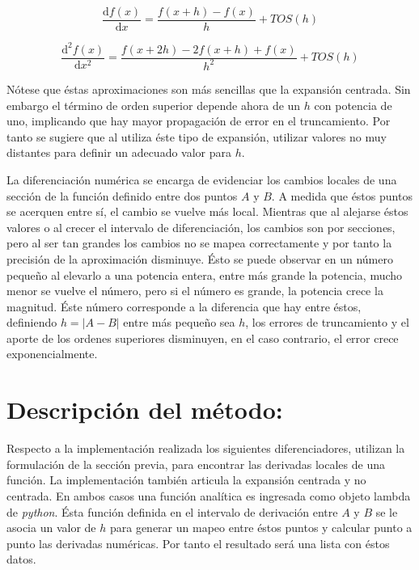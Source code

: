 \documentclass[letterpaper,10pt,oneside]{sphinxmanual}
\theoremstyle{plain}%
\theoremstyle{definition}%
\theoremstyle{remark}%
\begin{document}
\begin{equation}
\frac{\mathrm{d}f(x)}{\mathrm{d}x} = \frac{f(x + h) -  f(x)}{h} + TOS(h)
\end{equation}

\begin{equation}
\frac{\mathrm{d}^{2}f(x)}{\mathrm{d}x^{2}} = \frac{f(x + 2h) -  2f(x + h) + f(x)}{h^2} + TOS(h)
\end{equation}

Nótese que éstas aproximaciones son más sencillas que la expansión centrada. Sin embargo el término de orden superior depende ahora de un $h$ con potencia de uno, implicando que hay mayor propagación de error en el truncamiento. Por tanto se sugiere que al utiliza éste tipo de expansión, utilizar valores no muy distantes para definir un adecuado valor para $h$.

La diferenciación numérica se encarga de evidenciar los cambios locales de una sección de la función definido entre dos puntos $A$ y $B$. A medida que éstos puntos se acerquen entre sí, el cambio se vuelve más local. Mientras que al alejarse éstos valores o al crecer el intervalo de diferenciación, los cambios son por secciones, pero al ser tan grandes los cambios no se mapea correctamente y por tanto la precisión de la aproximación disminuye. Ésto se puede observar en un número pequeño al elevarlo a una potencia entera, entre más grande la potencia, mucho menor se vuelve el número, pero si el número es grande, la potencia crece la magnitud. Éste número corresponde a la diferencia que hay entre éstos, definiendo $h = |A-B|$ entre más pequeño sea $h$, los errores de truncamiento y el aporte de los ordenes superiores disminuyen, en el caso contrario, el error crece exponencialmente.


\section{Descripción del método:}
\label{chapter04:descripción-del-método}

Respecto a la implementación realizada los siguientes diferenciadores, utilizan la formulación de la sección previa, para encontrar las derivadas locales de una función. La implementación también articula la expansión centrada y no centrada. En ambos casos una función analítica es ingresada como objeto lambda de \textit{python}. Ésta función definida en el intervalo de derivación entre $A$ y $B$ se le asocia un valor de $h$ para generar un mapeo entre éstos puntos y calcular punto a punto las derivadas numéricas. Por tanto el resultado será una lista con éstos datos.
\end{document}
